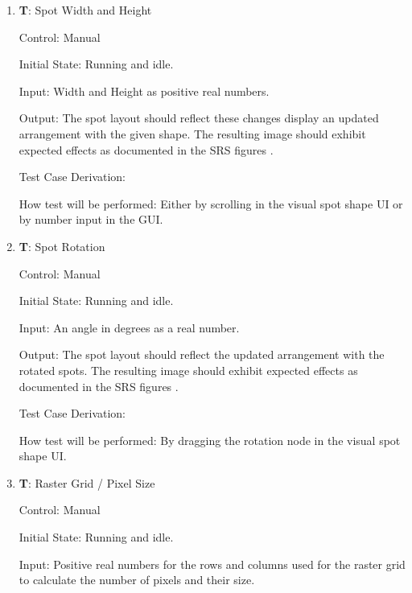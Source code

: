 \documentclass[12pt, titlepage]{article}
\newcounter{testnum} %
\begin{document}
\begin{enumerate}

  \item{\textbf{T\thetestnum \label{T_spotSize}}: Spot Width and Height\\}

    Control: Manual
              
    Initial State: Running and idle.
              
    Input: Width and Height as positive real numbers.
              
    Output: The spot layout should reflect these changes display an updated arrangement with the given shape.
    The resulting image should exhibit expected effects as documented in the SRS figures \citep{SRS}.

    Test Case Derivation: 
              
    How test will be performed: Either by scrolling in the visual spot shape UI or by number input in the GUI.
					
  \item{\textbf{T\thetestnum \label{T_spotRotation}}: Spot Rotation\\}

    Control: Manual
                
    Initial State: Running and idle.
              
    Input: An angle in degrees as a real number.
              
    Output: The spot layout should reflect the updated arrangement with the rotated spots.
    The resulting image should exhibit expected effects as documented in the SRS figures \citep{SRS}.

    Test Case Derivation: 

    How test will be performed: By dragging the rotation node in the visual spot shape UI.
					
    \item{\textbf{T\thetestnum \label{T_rasterGrid}}: Raster Grid / Pixel Size\\}

    Control: Manual
                
    Initial State: Running and idle.
              
    Input: Positive real numbers for the rows and columns used for the raster grid to calculate the number of pixels and their size.
              

\end{enumerate}
\end{document}
